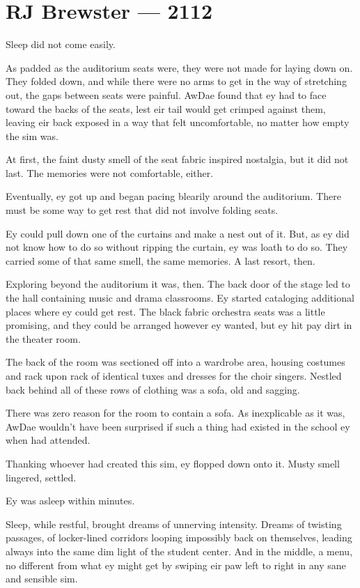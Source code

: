 \hypertarget{rj-brewster-2112}{%
\chapter*{RJ Brewster — 2112}\label{rj-brewster-2112}}

Sleep did not come easily.

As padded as the auditorium seats were, they were not made for laying down on. They folded down, and while there were no arms to get in the way of stretching out, the gaps between seats were painful. AwDae found that ey had to face toward the backs of the seats, lest eir tail would get crimped against them, leaving eir back exposed in a way that felt uncomfortable, no matter how empty the sim was.

At first, the faint dusty smell of the seat fabric inspired nostalgia, but it did not last. The memories were not comfortable, either.

Eventually, ey got up and began pacing blearily around the auditorium. There must be some way to get rest that did not involve folding seats.

Ey could pull down one of the curtains and make a nest out of it. But, as ey did not know how to do so without ripping the curtain, ey was loath to do so. They carried some of that same smell, the same memories. A last resort, then.

Exploring beyond the auditorium it was, then. The back door of the stage led to the hall containing music and drama classrooms. Ey started cataloging additional places where ey could get rest. The black fabric orchestra seats was a little promising, and they could be arranged however ey wanted, but ey hit pay dirt in the theater room.

The back of the room was sectioned off into a wardrobe area, housing costumes and rack upon rack of identical tuxes and dresses for the choir singers. Nestled back behind all of these rows of clothing was a sofa, old and sagging.

There was zero reason for the room to contain a sofa. As inexplicable as it was, AwDae wouldn't have been surprised if such a thing had existed in the school ey when had attended.

Thanking whoever had created this sim, ey flopped down onto it. Musty smell lingered, settled.

Ey was asleep within minutes.

Sleep, while restful, brought dreams of unnerving intensity. Dreams of twisting passages, of locker-lined corridors looping impossibly back on themselves, leading always into the same dim light of the student center. And in the middle, a menu, no different from what ey might get by swiping eir paw left to right in any sane and sensible sim.

